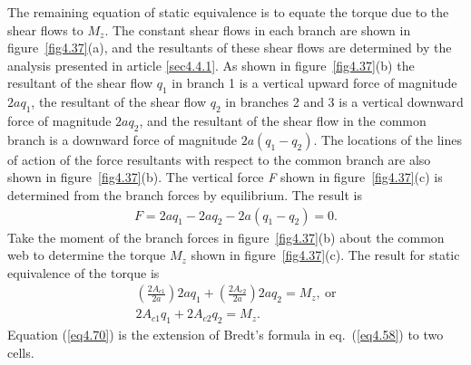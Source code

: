 \documentclass{AeroStructure-ERJohnson}
\begin{document}
\begin{example*}
The remaining equation of static equivalence is to equate the torque due to the shear flows to ${M}_z$. The constant shear flows in each branch are shown in figure~\ref{fig4.37}(a), and the resultants of these shear flows are determined by the analysis presented in article \ref{sec4.4.1}. As shown in figure~\ref{fig4.37}(b) the resultant of the shear flow $q_{1}$ in branch 1 is a vertical upward force of magnitude $2 a q_{1}$, the resultant of the shear flow $q_{2}$ in branches 2 and 3 is a vertical downward force of magnitude $2 a q_{2}$, and the resultant of the shear flow in the common branch is a downward force of magnitude $2 a\left(q_{1}-q_{2}\right)$. The locations of the lines of action of the force resultants with respect to the common branch are also shown in figure~\ref{fig4.37}(b). The vertical force \textit{F} shown in figure~\ref{fig4.37}(c) is determined from the branch forces by equilibrium. The result is
\begin{align}\label{ex4.10b}
F=2 a q_{1}-2 a q_{2}-2 a\left(q_{1}-q_{2}\right)=0.\tag{b}
\end{align}
Take the moment of the branch forces in figure~\ref{fig4.37}(b) about the common web to determine the torque ${M}_z$ shown in figure~\ref{fig4.37}(c). The result for static equivalence of the torque is\pagebreak
\begin{align}\label{eq4.70}
\left(\frac{2 A_{c 1}}{2 a}\right) 2 a q_{1}+\left(\frac{2 A_{c 2}}{2 a}\right) 2 a q_{2}=M_{z},\ \text{or}\nonumber\\
2 A_{c 1} q_{1}+2 A_{c 2} q_{2}=M_{z}.
\end{align}
Equation (\ref{eq4.70}) is the extension of Bredt's formula in eq.~(\ref{eq4.58}) to two cells.

{\def\thefigure{4.37}
}


\end{example*}
\end{document}
